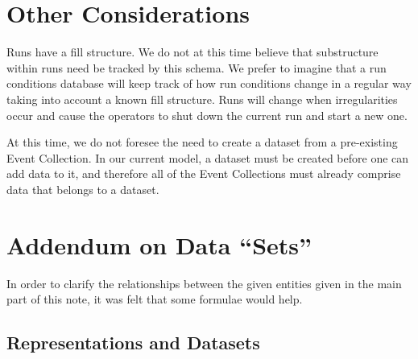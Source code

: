\documentclass{cmspaper}
\begin{document}
\section{Other Considerations}

Runs have a fill structure.  We do not at this time believe that substructure within 
runs need be tracked by this schema.  We prefer to imagine that a run conditions 
database will keep track of how run conditions change in a regular way taking into 
account a known fill structure.  Runs will change when irregularities occur and cause 
the operators to shut down the current run and start a new one.  

At this time, we do not foresee the need to create a dataset from a 
pre-existing Event Collection.  In our current model, a dataset must be created 
before one can add data to it, and therefore all of the Event Collections must 
already comprise data that belongs to a dataset.  


\appendix

\section{Addendum on Data ``Sets''}

In order to clarify the relationships between the given entities given in the main part of 
this note, it was felt that some formulae would help. 

\subsection{Representations and Datasets}
\end{document}
